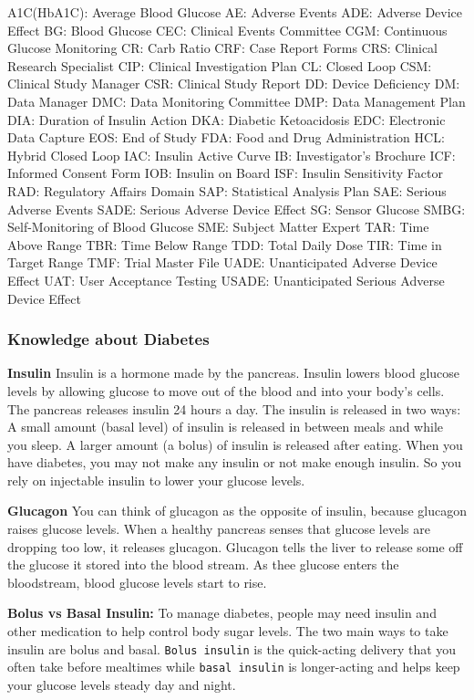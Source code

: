 \documentclass[
]{ctexart}
\begin{document}
A1C(HbA1C): Average Blood Glucose AE: Adverse Events ADE: Adverse Device
Effect BG: Blood Glucose CEC: Clinical Events Committee CGM: Continuous
Glucose Monitoring CR: Carb Ratio CRF: Case Report Forms CRS: Clinical
Research Specialist CIP: Clinical Investigation Plan CL: Closed Loop
CSM: Clinical Study Manager CSR: Clinical Study Report DD: Device
Deficiency DM: Data Manager DMC: Data Monitoring Committee DMP: Data
Management Plan DIA: Duration of Insulin Action DKA: Diabetic
Ketoacidosis EDC: Electronic Data Capture EOS: End of Study FDA: Food
and Drug Administration HCL: Hybrid Closed Loop IAC: Insulin Active
Curve IB: Investigator's Brochure ICF: Informed Consent Form IOB:
Insulin on Board ISF: Insulin Sensitivity Factor RAD: Regulatory Affairs
Domain SAP: Statistical Analysis Plan SAE: Serious Adverse Events SADE:
Serious Adverse Device Effect SG: Sensor Glucose SMBG: Self-Monitoring
of Blood Glucose SME: Subject Matter Expert TAR: Time Above Range TBR:
Time Below Range TDD: Total Daily Dose TIR: Time in Target Range TMF:
Trial Master File UADE: Unanticipated Adverse Device Effect UAT: User
Acceptance Testing USADE: Unanticipated Serious Adverse Device Effect

\hypertarget{knowledge-about-diabetes}{%
\subsubsection{\texorpdfstring{\textbf{Knowledge about
Diabetes}}{Knowledge about Diabetes}}\label{knowledge-about-diabetes}}

\textbf{Insulin} Insulin is a hormone made by the pancreas. Insulin
lowers blood glucose levels by allowing glucose to move out of the blood
and into your body's cells. The pancreas releases insulin 24 hours a
day. The insulin is released in two ways: A small amount (basal level)
of insulin is released in between meals and while you sleep. A larger
amount (a bolus) of insulin is released after eating. When you have
diabetes, you may not make any insulin or not make enough insulin. So
you rely on injectable insulin to lower your glucose levels.

\textbf{Glucagon} You can think of glucagon as the opposite of insulin,
because glucagon raises glucose levels. When a healthy pancreas senses
that glucose levels are dropping too low, it releases glucagon. Glucagon
tells the liver to release some off the glucose it stored into the blood
stream. As thee glucose enters the bloodstream, blood glucose levels
start to rise.

\textbf{Bolus vs Basal Insulin:} To manage diabetes, people may need
insulin and other medication to help control body sugar levels. The two
main ways to take insulin are bolus and basal. \texttt{Bolus\ insulin}
is the quick-acting delivery that you often take before mealtimes while
\texttt{basal\ insulin} is longer-acting and helps keep your glucose
levels steady day and night.
\end{document}

